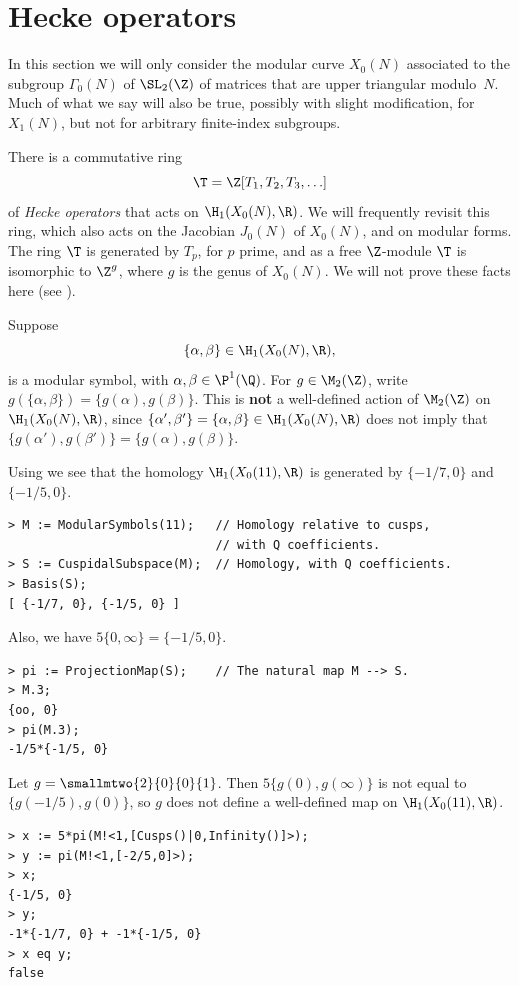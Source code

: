 \documentclass{report}
\begin{document}
\section{Hecke operators}
In this section we will only consider the modular curve $X_0(N)$
associated to the subgroup $\Gamma_0(N)$ of $\SL_2(\Z)$ of
matrices that are upper triangular modulo~$N$. Much of what we say
will also be true, possibly with slight modification, for
$X_1(N)$, but not for arbitrary finite-index subgroups.

There is a commutative ring $$\T=\Z[T_1,T_2,T_3,\ldots]$$ of {\em
Hecke operators} that acts on $\H_1(X_0(N),\R)$.  We will
frequently revisit this ring, which also acts on the Jacobian
$J_0(N)$ of $X_0(N)$, and on modular forms.   The ring $\T$ is
generated by $T_p$, for $p$ prime, and as a free $\Z$-module $\T$
is isomorphic to $\Z^g$, where $g$ is the genus of $X_0(N)$.  We
will not prove these facts here (see ).

Suppose $$\{\alpha,\beta\}\in\H_1(X_0(N),\R),$$ is a modular
symbol, with $\alpha,\beta\in\P^1(\Q)$.  For $g\in \M_2(\Z)$,
write $g(\{\alpha,\beta\}) = \{g(\alpha),g(\beta)\}$. This is {\bf
not} a well-defined action of $\M_2(\Z)$ on $\H_1(X_0(N),\R)$,
since $\{\alpha',\beta'\}=\{\alpha,\beta\}\in\H_1(X_0(N),\R)$ does
not imply that $\{g(\alpha'),g(\beta')\}=\{g(\alpha),g(\beta)\}$.

\begin{example}\label{ex:welldefmodsym}
Using \magma{} we see that the homology $\H_1(X_0(11),\R)$ is
generated by $\{-1/7,0\}$ and $\{-1/5,0\}$.
\begin{verbatim}
> M := ModularSymbols(11);   // Homology relative to cusps,
                             // with Q coefficients.
> S := CuspidalSubspace(M);  // Homology, with Q coefficients.
> Basis(S);
[ {-1/7, 0}, {-1/5, 0} ]
\end{verbatim}
Also, we have $5\{0,\infty\} =\{-1/5,0\}.$
\begin{verbatim}
> pi := ProjectionMap(S);    // The natural map M --> S.
> M.3;
{oo, 0}
> pi(M.3);
-1/5*{-1/5, 0}
\end{verbatim}
Let $g=\smallmtwo{2}{0}{0}{1}$.  Then $5\{g(0),g(\infty)\}$ is not
equal to $\{g(-1/5),g(0)\}$, so $g$ does not define a well-defined
map on $\H_1(X_0(11),\R)$.
\begin{verbatim}
> x := 5*pi(M!<1,[Cusps()|0,Infinity()]>);
> y := pi(M!<1,[-2/5,0]>);
> x;
{-1/5, 0}
> y;
-1*{-1/7, 0} + -1*{-1/5, 0}
> x eq y;
false
\end{verbatim}
\end{example}
\end{document}

